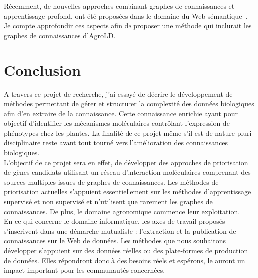 
Récemment, de nouvelles approches combinant graphes de connaissances et apprentissage profond, ont été proposées dans le domaine du Web sémantique~\cite{rdf2vec2016,cochez2017,vec2sparql2018,nikolov2018combining}. Je compte approfondir ces aspects afin de proposer une méthode qui inclurait les graphes de connaissances d'AgroLD.

\section{Conclusion}
A travers ce projet de recherche, j'ai essayé de décrire le développement de méthodes permettant de gérer et structurer la complexité des données biologiques afin d'en extraire de la connaissance. Cette connaissance enrichie ayant pour objectif d’identifier les mécanismes moléculaires contrôlant l’expression de phénotypes chez les plantes. La finalité de ce projet même s'il est de nature pluri-disciplinaire reste avant tout tourné vers l'amélioration des connaissances biologiques.\\

L’objectif de ce projet sera en effet, de développer des approches de priorisation de gènes candidats utilisant un réseau d’interaction moléculaires comprenant des sources multiples issues de graphes de connaissances. Les méthodes de priorisation actuelles s'appuient essentiellement sur les méthodes d'apprentissage supervisé et non supervisé et n'utilisent que rarement les graphes de connaissances. De plus, le domaine agronomique commence leur exploitation. \\

En ce qui concerne le domaine informatique, les  axes de travail proposés s'inscrivent dans une démarche mutualiste : l'extraction et la publication de connaissances sur le Web de données. Les méthodes que nous souhaitons développer s'appuient sur des données réelles ou des plate-formes de production de données. Elles répondront donc à des besoins réels et espérons, le auront un impact important pour les communautés concernées.\\

